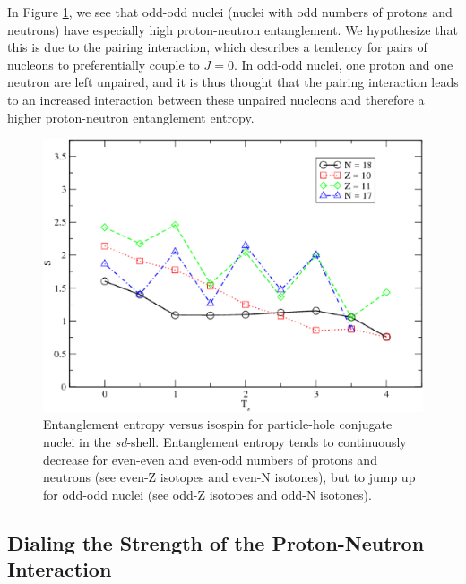 In Figure \ref{fig: tz1}, we see that odd-odd nuclei (nuclei with odd numbers of protons
and neutrons) have especially high proton-neutron entanglement. We hypothesize that
this is due to the pairing interaction, which describes a tendency for pairs
of nucleons to preferentially couple to $J=0$\cite{Brussard}. In odd-odd nuclei,
one proton and one neutron are left unpaired, and it is thus thought that the pairing
interaction leads to an increased interaction between these unpaired nucleons and
therefore a higher proton-neutron entanglement entropy.

\begin{figure}
    \centering
        \includegraphics[width=.75\textwidth,clip]{Figures/s_vs_tz_sd}
        \caption{Entanglement entropy versus isospin for particle-hole conjugate nuclei in the
\textit{sd}-shell. Entanglement entropy tends to continuously decrease for even-even and even-odd 
numbers of protons and neutrons (see even-Z isotopes and even-N isotones), but 
to jump up for odd-odd nuclei (see odd-Z isotopes
and odd-N isotones).}
    \label{fig: tz1}
\end{figure}




\subsection{Dialing the Strength of the Proton-Neutron Interaction}

